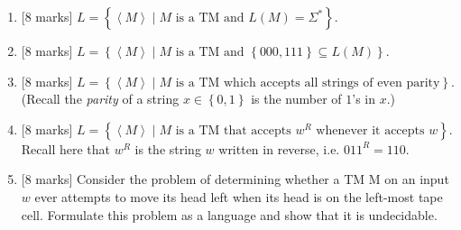 \documentclass{article}
\newcommand{\set}[1]{{\left\{#1\right\}}}    %
\newcommand{\enc}[1]{\left<#1\right>}
\begin{document}
\begin{enumerate}
    \begin{enumerate}
    \item {[8 marks]} $L=\set{\enc{M}\mid M\text{ is a TM and }L(M)=\Sigma^*}$.
            \item {[8 marks]} $L=\set{\enc{M}\mid M\text{ is a TM and }\set{000,111}\subseteq L(M)}$.
            \item {[8 marks]} $L=\set{\enc{M}\mid M\text{ is a TM which accepts all strings of even parity}}$. (Recall the \emph{parity} of a string $x\in\set{0,1}$ is the number of $1$'s in $x$.)
        \item {[8 marks]} $L=\set{\enc{M}\mid M\text{ is a TM that accepts }w^R\text{ whenever it accepts }w}$. Recall here that $w^R$ is the string $w$ written in reverse, i.e. $011^R=110$.
        \item {[8 marks]} Consider the problem of determining whether a TM M on an input $w$ ever attempts to move its head left when its head is on the left-most tape cell. Formulate this problem as a language and show that it is undecidable.
    \end{enumerate}
 \end{enumerate}
\end{document}
